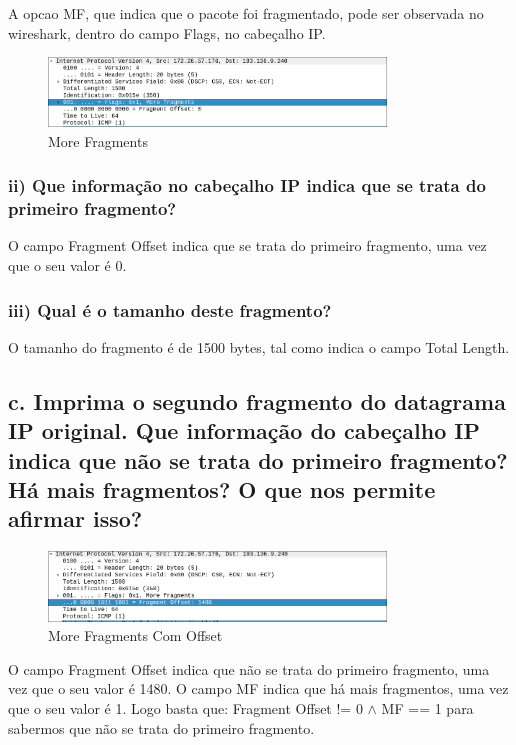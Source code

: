 \documentclass{article}
\begin{document}
A opcao MF, que indica que o pacote foi fragmentado, pode ser observada no wireshark, dentro do campo Flags, no cabeçalho IP.

\begin{figure}[h]
    \centering
    \includegraphics[width=0.8\textwidth]{images/mf.png}
    \caption{\label{fig:more_fragments}More Fragments}
\end{figure}

\subsubsection*{ii) Que informação
no cabeçalho IP indica que se trata do primeiro fragmento?}

O campo Fragment Offset indica que se trata do primeiro fragmento, uma vez que o seu valor é 0.

\subsubsection*{iii) Qual é o tamanho deste fragmento?}

O tamanho do fragmento é de 1500 bytes, tal como indica o campo Total Length.

\subsection*{c. Imprima o segundo fragmento do datagrama IP original. Que informação
do cabeçalho IP indica que não se trata do primeiro fragmento? Há mais
fragmentos? O que nos permite afirmar isso?}

\begin{figure}[h]
    \centering
    \includegraphics[width=0.8\textwidth]{images/mf_offset.png}
    \caption{\label{fig:more_fragments_offset}More Fragments Com Offset}
\end{figure}

O campo Fragment Offset indica que não se trata do primeiro fragmento, uma vez que o seu valor é 1480. O campo MF indica que há mais fragmentos, uma vez que o seu valor é 1.
Logo basta que: Fragment Offset != 0 $\wedge$ MF == 1 para sabermos que não se trata do primeiro fragmento.
\end{document}
